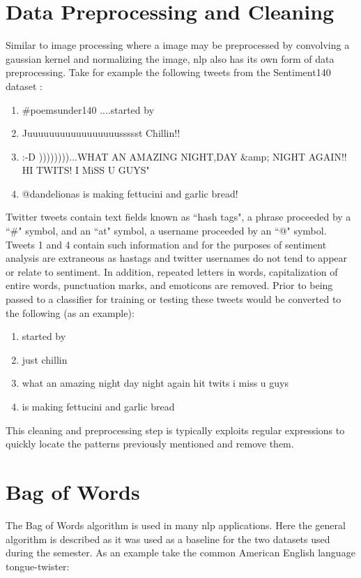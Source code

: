 \documentclass[12pt]{article}
\begin{document}
\section {Data Preprocessing and Cleaning}
Similar to image processing where a image may be preprocessed by convolving a gaussian kernel and normalizing the image, \ac{nlp} also has its own form of data preprocessing. Take for example the following tweets from the Sentiment140 dataset \cite{sentiment140}:

\begin{enumerate}
\item \#poemsunder140 ....started by 
\item Juuuuuuuuuuuuuuuuussssst Chillin!!
\item :-D ))))))))...WHAT AN AMAZING NIGHT,DAY \&amp; NIGHT AGAIN!! HI TWITS! I MiSS U GUYS"
\item @dandelionas is making fettucini and garlic bread!
\end{enumerate} 

Twitter tweets contain text fields known as ``hash tags", a phrase proceeded by a ``\#" symbol, and an ``at" symbol, a username proceeded by an ``@" symbol. Tweets 1 and 4 contain such information and for the purposes of sentiment analysis are extraneous as hastags and twitter usernames do not tend to appear or relate to sentiment. In addition, repeated letters in words, capitalization of entire words, punctuation marks, and emoticons are removed. Prior to being passed to a classifier for training or testing these tweets would be converted to the following (as an example): 

\begin{enumerate}
	\item started by
	\item just chillin
	\item what an amazing night day night again hit twits i miss u guys
	\item is making fettucini and garlic bread
\end{enumerate} 

This cleaning and preprocessing step is typically exploits regular expressions to quickly locate the patterns previously mentioned and remove them.


\section {Bag of Words}

The Bag of Words algorithm is used in many \ac{nlp} applications. Here the general algorithm is described as it was used as a baseline for the two datasets used during the semester. As an example take the common American English language tongue-twister:
\end{document}
